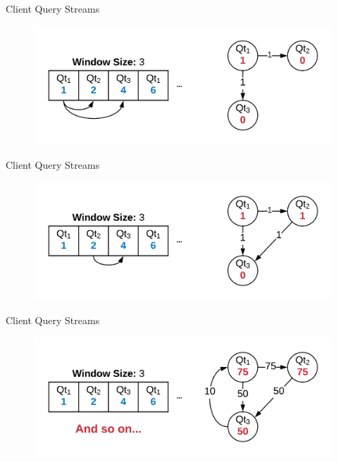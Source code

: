 \documentclass[12pt]{beamer}
\begin{document}
\begin{frame}[fragile]{Client Query Streams}
    \begin{figure}
        \includegraphics[scale=0.2]{apollo_client_query_stream_3}
    \end{figure}
\end{frame}

\begin{frame}[fragile]{Client Query Streams}
    \begin{figure}
        \includegraphics[scale=0.2]{apollo_client_query_stream_4}
    \end{figure}
\end{frame}

\begin{frame}[fragile]{Client Query Streams}
    \begin{figure}
        \includegraphics[scale=0.2]{apollo_client_query_stream_5}
    \end{figure}
\end{frame}
\end{document}
